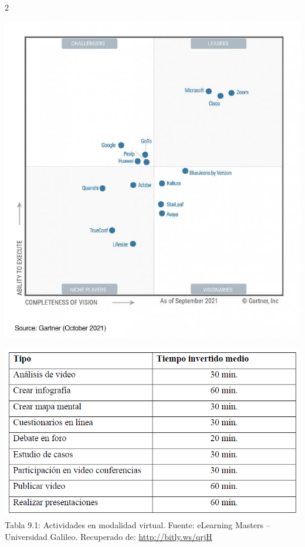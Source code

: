 \documentclass[12pt,spanish,Letterpaper,openany]{book}
\begin{document}
\begin {multicols}{2}
\begin {flushleft}
\begin{minipage}[c]{\columnwidth}
\includegraphics[width=1\linewidth]{images/mMorales_image4}

\end{minipage}
\end {flushleft}

\begin {flushleft}
\noindent\begin{minipage}[c]{\columnwidth}

\includegraphics[width=1\linewidth]{images/mMorales_image5}
Tabla 9.1: Actividades en modalidad virtual. Fuente: eLearning Masters -- Universidad Galileo. Recuperado de: \url{http://bitly.ws/qrjH}

\end{minipage}
\end {flushleft}

\end {multicols}
\end{document}
